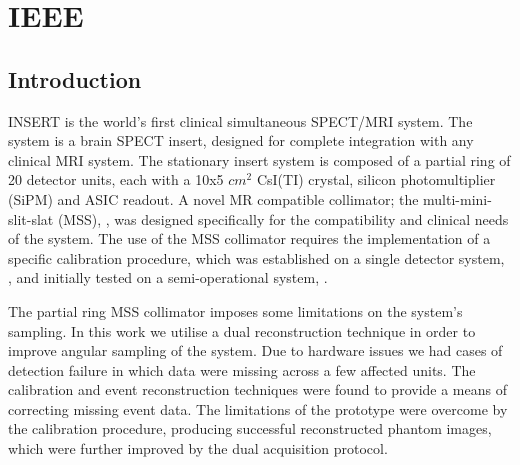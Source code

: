 \chapter{IEEE}
\label{chapterlabel3}


\section{Introduction}

INSERT is the world's first clinical simultaneous SPECT/MRI system. The system is a brain SPECT insert, designed for complete integration with any clinical MRI system. The stationary insert system is composed of a partial ring of 20 detector units, each with a 10x5 $cm^2$ CsI(TI) crystal, silicon photomultiplier (SiPM) and ASIC readout. A novel MR compatible collimator; the multi-mini-slit-slat (MSS), \cite{7430894}, was designed specifically for the compatibility and clinical needs of the system. The use of the MSS collimator requires the implementation of a specific calibration procedure, which was established on a single detector system, \cite{8340862}, and initially tested on a semi-operational system, \cite{inproceedings}.

The partial ring MSS collimator imposes some limitations on the system's sampling. In this work we utilise a dual reconstruction technique in order to improve angular sampling of the system. Due to hardware issues we had cases of detection failure in which data were missing across a few affected units. The calibration and event reconstruction techniques were found to provide a means of correcting missing event data. The limitations of the prototype were overcome by the calibration procedure, producing successful reconstructed phantom images, which were further improved by the dual acquisition protocol.   

